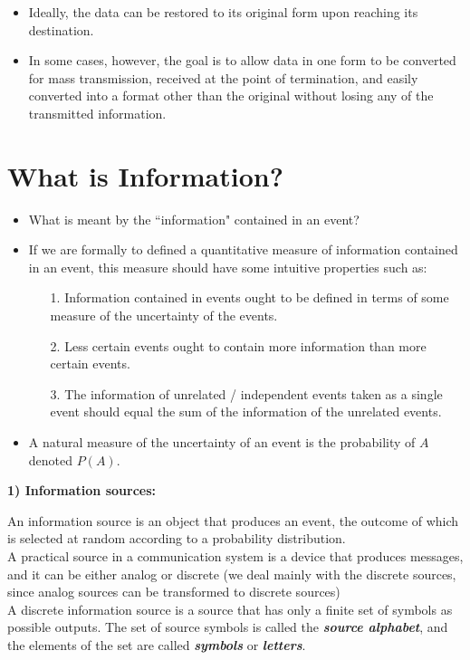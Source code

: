
\begin{itemize}
\item Ideally, the data can be restored to its original form upon reaching its destination. 
\item In some cases, however, the goal is to allow data in one form to be converted for mass transmission, 
received at the point of termination, and easily converted into a format other than the original without losing any of the transmitted information.
\end{itemize}



\section{What is Information?}

\begin{itemize} \item  What is meant by the ``information" contained in an event?
\item If we are formally to defined a quantitative measure of information contained in an event, this measure should have some intuitive properties such as:
\begin{itemize} \item [1.] Information contained in events ought to be defined in terms of some measure of the uncertainty of the events.
\item [2.] Less certain events ought to contain more information than more certain events.
\item [3.] The information of unrelated / independent events taken as a single event should equal the sum of the information of the unrelated events.
\end{itemize}

\item A natural measure of the uncertainty of an event is the probability of $A$ denoted $P(A)$.
\end{itemize}

\textbf{1) Information sources:}

An information source is an object that produces an event, the outcome of which is selected at
random according to a probability distribution.  \\ \bigskip A practical source in a communication system is a
device that produces messages, and it can be either analog or discrete (we deal mainly
with the discrete sources, since analog sources can be transformed to discrete sources) \\ \bigskip A discrete information source is a
source that has only a finite set of symbols as possible outputs. The set of source symbols is called the
\textbf{\emph{source alphabet}}, and the elements of the set are called \textbf{\emph{ symbols}} or \textbf{\emph{letters}}.

